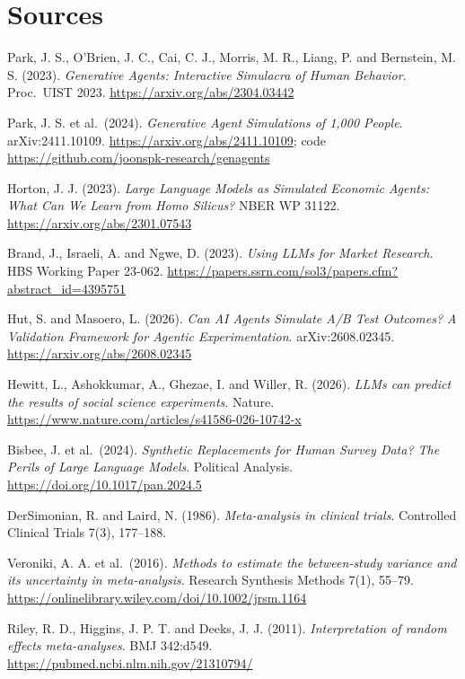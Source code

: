 \section*{Sources}
\begingroup\raggedright
\begin{enumerate}[label={[\arabic*]},leftmargin=2.5em]
\item Park, J. S., O'Brien, J. C., Cai, C. J., Morris, M. R., Liang, P. and Bernstein, M. S. (2023). \emph{Generative Agents: Interactive Simulacra of Human Behavior}. Proc.\ UIST 2023. \url{https://arxiv.org/abs/2304.03442}
\item Park, J. S. et al.\ (2024). \emph{Generative Agent Simulations of 1,000 People}. arXiv:2411.10109. \url{https://arxiv.org/abs/2411.10109}; code \url{https://github.com/joonspk-research/genagents}
\item Horton, J. J. (2023). \emph{Large Language Models as Simulated Economic Agents: What Can We Learn from Homo Silicus?} NBER WP 31122. \url{https://arxiv.org/abs/2301.07543}
\item Brand, J., Israeli, A. and Ngwe, D. (2023). \emph{Using LLMs for Market Research}. HBS Working Paper 23-062. \url{https://papers.ssrn.com/sol3/papers.cfm?abstract_id=4395751}
\item Hut, S. and Masoero, L. (2026). \emph{Can AI Agents Simulate A/B Test Outcomes? A Validation Framework for Agentic Experimentation}. arXiv:2608.02345. \url{https://arxiv.org/abs/2608.02345}
\item Hewitt, L., Ashokkumar, A., Ghezae, I. and Willer, R. (2026). \emph{LLMs can predict the results of social science experiments}. Nature. \url{https://www.nature.com/articles/s41586-026-10742-x}
\item Bisbee, J. et al.\ (2024). \emph{Synthetic Replacements for Human Survey Data? The Perils of Large Language Models}. Political Analysis. \url{https://doi.org/10.1017/pan.2024.5}
\item DerSimonian, R. and Laird, N. (1986). \emph{Meta-analysis in clinical trials}. Controlled Clinical Trials 7(3), 177--188.
\item Veroniki, A. A. et al.\ (2016). \emph{Methods to estimate the between-study variance and its uncertainty in meta-analysis}. Research Synthesis Methods 7(1), 55--79. \url{https://onlinelibrary.wiley.com/doi/10.1002/jrsm.1164}
\item Riley, R. D., Higgins, J. P. T. and Deeks, J. J. (2011). \emph{Interpretation of random effects meta-analyses}. BMJ 342:d549. \url{https://pubmed.ncbi.nlm.nih.gov/21310794/}

\end{enumerate}
